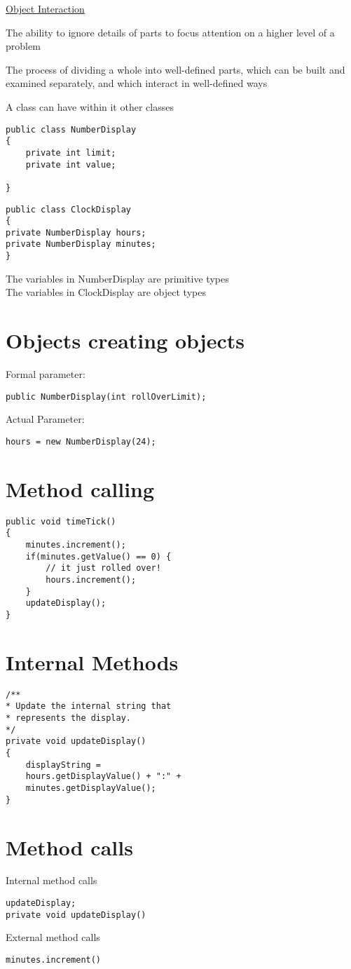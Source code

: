 \documentclass{article}[18pt]
\begin{document}
\begin{center}
\underline{\huge Object Interaction}
\end{center}
\begin{definition}[Abstraction]
The ability to ignore details of parts to focus attention on a higher level of a problem
\end{definition}

\begin{definition}[Modularisation]
The process of dividing a whole into well-defined parts, which can be built and examined separately, and which interact in well-defined ways
\end{definition}
A class can have within it other classes
\begin{verbatim}
public class NumberDisplay
{
	private int limit;
	private int value;

}
\end{verbatim}

\begin{verbatim}
public class ClockDisplay
{
private NumberDisplay hours;
private NumberDisplay minutes;
}
\end{verbatim}

The variables in NumberDisplay are primitive types\\
The variables in ClockDisplay are object types
\section{Objects creating objects}
Formal parameter:
\begin{verbatim}
public NumberDisplay(int rollOverLimit);
\end{verbatim}
Actual Parameter:
\begin{verbatim}
hours = new NumberDisplay(24);
\end{verbatim}
\section{Method calling}
\begin{verbatim}
public void timeTick()
{
	minutes.increment();
	if(minutes.getValue() == 0) { 
		// it just rolled over!
		hours.increment();
	}
	updateDisplay();
}
\end{verbatim}
\newpage
\section{Internal Methods}
\begin{verbatim}
/**
* Update the internal string that
* represents the display.
*/
private void updateDisplay()
{
	displayString = 
	hours.getDisplayValue() + ":" + 
	minutes.getDisplayValue();
}
\end{verbatim}
\section{Method calls}
Internal method calls
\begin{verbatim}
updateDisplay;
private void updateDisplay()
\end{verbatim}
External method calls
\begin{verbatim}
minutes.increment()
\end{verbatim}
\end{document}
